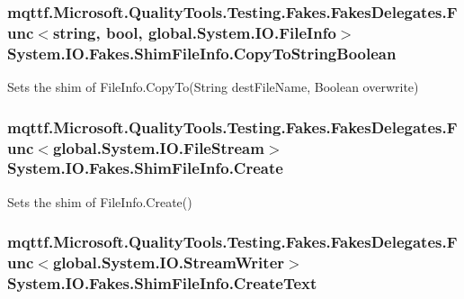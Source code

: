\hypertarget{class_system_1_1_i_o_1_1_fakes_1_1_shim_file_info_a2ee41eff7a51bfa3c37e16bd53269788}{
\subsubsection[{Copy\-To\-String\-Boolean}]{\setlength{\rightskip}{0pt plus 5cm}mqttf.\-Microsoft.\-Quality\-Tools.\-Testing.\-Fakes.\-Fakes\-Delegates.\-Func$<$string, bool, global.\-System.\-I\-O.\-File\-Info$>$ System.\-I\-O.\-Fakes.\-Shim\-File\-Info.\-Copy\-To\-String\-Boolean\hspace{0.3cm}{\ttfamily [set]}}}\label{class_system_1_1_i_o_1_1_fakes_1_1_shim_file_info_a2ee41eff7a51bfa3c37e16bd53269788}


Sets the shim of File\-Info.\-Copy\-To(\-String dest\-File\-Name, Boolean overwrite)

\hypertarget{class_system_1_1_i_o_1_1_fakes_1_1_shim_file_info_a4c0b6336385df53fcc3783e180b1218a}{
\subsubsection[{Create}]{\setlength{\rightskip}{0pt plus 5cm}mqttf.\-Microsoft.\-Quality\-Tools.\-Testing.\-Fakes.\-Fakes\-Delegates.\-Func$<$global.\-System.\-I\-O.\-File\-Stream$>$ System.\-I\-O.\-Fakes.\-Shim\-File\-Info.\-Create\hspace{0.3cm}{\ttfamily [set]}}}\label{class_system_1_1_i_o_1_1_fakes_1_1_shim_file_info_a4c0b6336385df53fcc3783e180b1218a}


Sets the shim of File\-Info.\-Create()

\hypertarget{class_system_1_1_i_o_1_1_fakes_1_1_shim_file_info_a813ab7d4ac151ed458e0cfbaff869c43}{
\subsubsection[{Create\-Text}]{\setlength{\rightskip}{0pt plus 5cm}mqttf.\-Microsoft.\-Quality\-Tools.\-Testing.\-Fakes.\-Fakes\-Delegates.\-Func$<$global.\-System.\-I\-O.\-Stream\-Writer$>$ System.\-I\-O.\-Fakes.\-Shim\-File\-Info.\-Create\-Text\hspace{0.3cm}{\ttfamily [set]}}}\label{class_system_1_1_i_o_1_1_fakes_1_1_shim_file_info_a813ab7d4ac151ed458e0cfbaff869c43}


